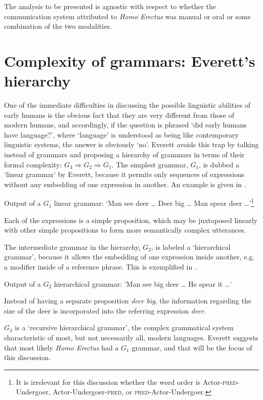 \documentclass[output=paper,colorlinks,citecolor=brown]{langscibook}
\begin{document}
The analysis to be presented is agnostic with respect to whether the communication system attributed to \emph{Homo Erectus} was manual or oral or some combination of the two modalities.

\section{Complexity of grammars: Everett’s hierarchy}\label{sec:vanvalin:2}
One of the immediate difficulties in discussing the possible linguistic abilities of early humans is the obvious fact that they are very different from those of modern humans, and accordingly, if the question is phrased ‘did early humans have language?’, where ‘language’ is understood as being like contemporary linguistic systems, the answer is obviously ‘no’.  Everett avoids this trap by talking instead of grammars and proposing a hierarchy of grammars in terms of their formal complexity: $G_3 \Rightarrow G_2 \Rightarrow G_1$.  The simplest grammar, $G_1$, is dubbed a ‘linear grammar’ by Everett, because it permits only sequences of expressions without any embedding of one expression in another. An example is given in .

\ea \label{vanvalin_example_1}
Output of a $G_1$ linear grammar: ‘Man see deer \ldots{}  Deer big \ldots{}  Man spear deer \ldots ’\footnote{It is irrelevant for this discussion whether the word order is Actor-\textsc{pred}-Undergoer, Actor-Undergoer-\textsc{pred}, or \textsc{pred}-Actor-Undergoer.}
\z

Each of the expressions is a simple proposition, which may be juxtaposed linearly with other simple propositions to form more semantically complex utterances.

The intermediate grammar in the hierarchy, $G_2$, is labeled a ‘hierarchical grammar’, because it allows the embedding of one expression inside another, e.g. a modifier inside of a reference phrase.  This is exemplified in .

\ea \label{vanvalin_example_2}
Output of a $G_2$ hierarchical grammar: 'Man see big deer \ldots{}  He spear it \ldots ’
\z

Instead of having a separate proposition \emph{deer big}, the information regarding the size of the deer is incorporated into the referring expression \emph{deer}.

$G_3$ is a ‘recursive hierarchical grammar’, the complex grammatical system characteristic of most, but not necessarily all, modern languages.  Everett suggests that most likely \emph{Homo Erectus} had a $G_1$ grammar, and that will be the focus of this discussion.
\end{document}
